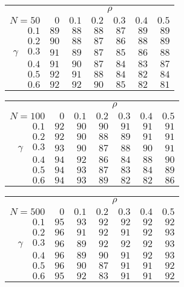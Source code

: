 \begin{tabular}{r|rrrrrr}
\hline\hline
 &\multicolumn{6}{c}{$\rho$} \\ 
 $N = 50$ & $0$ & $0.1$ & $0.2$ & $0.3$ & $0.4$ & $0.5$ \\ 
 \hline$0.1$ & $89$ & $88$ & $88$ & $87$ & $89$ & $89$\\ 
$0.2$ & $90$ & $88$ & $87$ & $86$ & $88$ & $89$\\ 
$\gamma\quad$$0.3$ & $91$ & $89$ & $87$ & $85$ & $86$ & $88$\\ 
$0.4$ & $91$ & $90$ & $87$ & $84$ & $83$ & $87$\\ 
$0.5$ & $92$ & $91$ & $88$ & $84$ & $82$ & $84$\\ 
$0.6$ & $92$ & $92$ & $90$ & $85$ & $82$ & $81$\\ 
 \hline 
 \end{tabular}
 
 \vspace{2em} 
 
\begin{tabular}{r|rrrrrr}
\hline\hline
 &\multicolumn{6}{c}{$\rho$} \\ 
 $N = 100$ & $0$ & $0.1$ & $0.2$ & $0.3$ & $0.4$ & $0.5$ \\ 
 \hline$0.1$ & $92$ & $90$ & $90$ & $91$ & $91$ & $91$\\ 
$0.2$ & $92$ & $90$ & $88$ & $89$ & $91$ & $91$\\ 
$\gamma\quad$$0.3$ & $93$ & $90$ & $87$ & $88$ & $90$ & $91$\\ 
$0.4$ & $94$ & $92$ & $86$ & $84$ & $88$ & $90$\\ 
$0.5$ & $94$ & $93$ & $87$ & $83$ & $84$ & $89$\\ 
$0.6$ & $94$ & $93$ & $89$ & $82$ & $82$ & $86$\\ 
 \hline 
 \end{tabular}
 
 \vspace{2em} 
 
\begin{tabular}{r|rrrrrr}
\hline\hline
 &\multicolumn{6}{c}{$\rho$} \\ 
 $N = 500$ & $0$ & $0.1$ & $0.2$ & $0.3$ & $0.4$ & $0.5$ \\ 
 \hline$0.1$ & $95$ & $93$ & $92$ & $92$ & $92$ & $92$\\ 
$0.2$ & $96$ & $91$ & $92$ & $91$ & $92$ & $93$\\ 
$\gamma\quad$$0.3$ & $96$ & $89$ & $92$ & $92$ & $92$ & $93$\\ 
$0.4$ & $96$ & $89$ & $90$ & $91$ & $92$ & $93$\\ 
$0.5$ & $96$ & $90$ & $87$ & $91$ & $91$ & $92$\\ 
$0.6$ & $95$ & $92$ & $83$ & $91$ & $91$ & $92$\\ 
 \hline 
 \end{tabular}